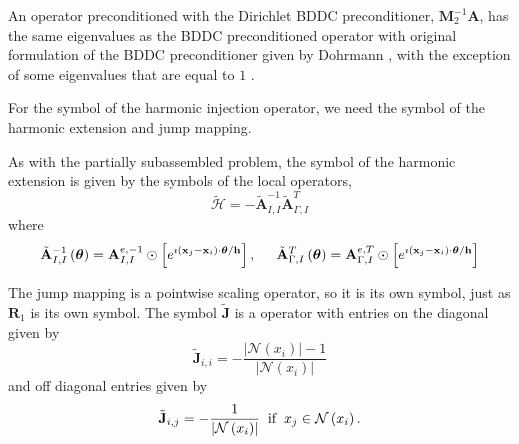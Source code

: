 \documentclass[review]{siamart190516}
\begin{document}
An operator preconditioned with the Dirichlet BDDC preconditioner, $\mathbf{M}^{-1}_2 \mathbf{A}$, has the same eigenvalues as the BDDC preconditioned operator with original formulation of the BDDC preconditioner given by Dohrmann \cite{dohrmann2003preconditioner}, with the exception of some eigenvalues that are equal to $1$ \cite{li2007use}.

For the symbol of the harmonic injection operator, we need the symbol of the harmonic extension and jump mapping.

As with the partially subassembled problem, the symbol of the harmonic extension is given by the symbols of the local operators,
\begin{equation}
\tilde{\boldsymbol{\mathcal{H}}} = - \tilde{\mathbf{A}}_{I, I}^{-1} \tilde{\mathbf{A}}_{\Gamma, I}^T
\end{equation}
where
\begin{equation}
\tilde{\mathbf{A}}_{I, I}^{-1} \left( \boldsymbol{\theta} \right) = \mathbf{A}_{I, I}^{e, -1} \odot \left[ e^{\imath \left( \mathbf{x}_j - \mathbf{x}_i \right) \cdot \boldsymbol{\theta} / \mathbf{h}} \right],
\hspace{5mm}
\tilde{\mathbf{A}}_{\Gamma, I}^T \left( \boldsymbol{\theta} \right) = \mathbf{A}_{\Gamma, I}^{e, T} \odot \left[ e^{\imath \left( \mathbf{x}_j - \mathbf{x}_i \right) \cdot \boldsymbol{\theta} / \mathbf{h}} \right]
\end{equation}

The jump mapping is a pointwise scaling operator, so it is its own symbol, just as $\mathbf{R}_1$ is its own symbol.
The symbol $\tilde{\mathbf{J}}$ is a operator with entries on the diagonal given by
\begin{equation}
\tilde{\mathbf{J}}_{i, i} = - \frac{\lvert \mathcal{N} \left( x_i \right) \rvert - 1}{\lvert \mathcal{N} \left( x_i \right) \rvert}
\end{equation}
and off diagonal entries given by
\begin{equation}
\tilde{\mathbf{J}}_{i, j} = - \frac{1}{\lvert \mathcal{N} \left( x_i \right) \rvert} \hspace{2mm} \text{if} \hspace{2mm} x_j \in \mathcal{N} \left( x_i \right).
\end{equation}
\end{document}
